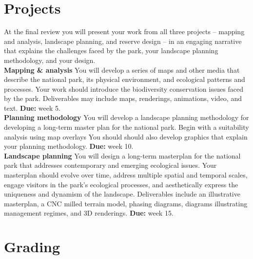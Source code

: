 \documentclass[11pt,article,oneside]{memoir}
\begin{document}

\section{Projects}
\normalsize
At the final review you will present your work from all three projects -- 
mapping and analysis, landscape planning, and reserve design -- 
in an engaging narrative that explains the challenges faced by the park, 
your landscape planning methodology, and your design. 
\\

\noindent \textbf{Mapping \& analysis}
You will develop a series of maps and other media that describe the national park,
its physical environment, and ecological patterns and processes. 
Your work should introduce the biodiversity conservation issues 
faced by the park.
Deliverables may include maps, renderings, animations, video, and text. 
\textbf{Due:} week 5.
\\

\noindent \textbf{Planning methodology}
You will develop a landscape planning methodology 
for developing a long-term master plan for the national park. 
Begin with a suitability analysis using map overlays
You should should also develop graphics that explain your planning methodology. 
\textbf{Due:} week 10.
\\

\noindent \textbf{Landscape planning}
You will design a long-term masterplan for the national park
that addresses contemporary and emerging ecological issues. 
Your masterplan should evolve over time, 
address multiple spatial and temporal scales, 
engage visitors in the park's ecological processes,
and aesthetically express the uniqueness and dynamism of the landscape. 
Deliverables include an illustrative masterplan, a CNC milled terrain model, 
phasing diagrams, diagrams illustrating management regimes, and 3D renderings.
\textbf{Due:} week 15.
\\

\section{Grading}
\end{document}
